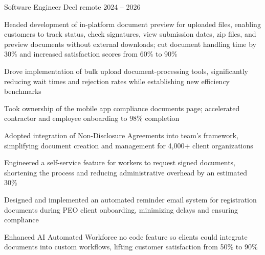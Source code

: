 

\begin{cventries}

\cventry
{Software Engineer} %
{Deel} %
{remote} %
{2024 -- 2026} %
{
	\begin{cvitems} %
		\item {Headed development of in-platform document preview for uploaded files, enabling customers to track status, check signatures, view submission dates, zip files, and preview documents without external downloads; cut document handling time by 30\% and increased satisfaction scores from 60\% to 90\%}
		\item {Drove implementation of bulk upload document-processing tools, significantly reducing wait times and rejection rates while establishing new efficiency benchmarks}
		\item {Took ownership of the mobile app compliance documents page; accelerated contractor and employee onboarding to 98\% completion}
		\item {Adopted integration of Non-Disclosure Agreements into team's framework, simplifying document creation and management for 4,000+ client organizations}
		\item {Engineered a self-service feature for workers to request signed documents, shortening the process and reducing administrative overhead by an estimated 30\%}
		\item {Designed and implemented an automated reminder email system for registration documents during PEO client onboarding, minimizing delays and ensuring compliance}
		\item {Enhanced AI Automated Workforce no code feature so clients could integrate documents into custom workflows, lifting customer satisfaction from 50\% to 90\%}
	\end{cvitems}
}



\end{cventries}
